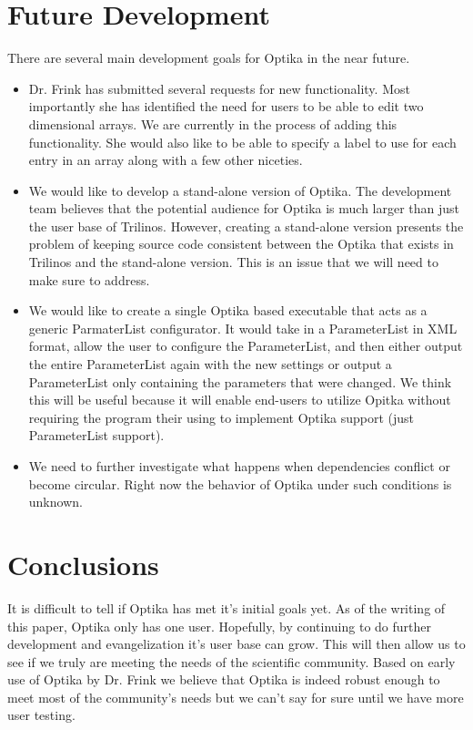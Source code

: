 \section{Future Development}
There are several main development goals for Optika in the near future. 
\begin{itemize}

\item Dr. Frink has submitted several requests for new functionality. Most 
importantly she has identified the need for users to be able to edit two
dimensional arrays. We are currently in the process of adding this 
functionality. She would also like to be able to specify a label to use for
each entry in an array along with a few other niceties.

\item We would like to develop a stand-alone version of Optika. The development team believes that the potential audience for Optika is much 
larger than just the user base of Trilinos. However, creating a stand-alone version presents the problem of keeping source code consistent between
the Optika that exists in Trilinos and the stand-alone version. This is an issue that we will need to make sure to address.

\item We would like to create a single Optika based executable that acts as a generic ParmaterList configurator. It would take in a ParameterList in
XML format, allow the user to configure the ParameterList, and then either output the entire ParameterList again with the new settings or output
a ParameterList only containing the parameters that were changed. We think this will be useful because it will enable end-users to utilize
Opitka without requiring the program their using to implement Optika support (just ParameterList support).

\item We need to further investigate what happens when dependencies conflict
or become circular. Right now the behavior of Optika under such conditions
is unknown.

\end{itemize}

\section{Conclusions}
It is difficult to tell if Optika has met it's initial goals yet. As of the writing of this paper, Optika only has one user. Hopefully, by continuing to do
further development and evangelization it's user base can grow. This will then allow us to see if we truly are meeting the needs of the scientific community.
Based on early use of Optika by Dr. Frink we believe that Optika is indeed robust enough to meet most of the community's needs but we can't say for sure
until we have more user testing.

